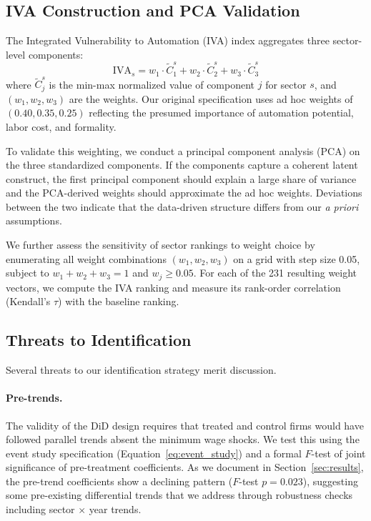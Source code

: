 \documentclass[5p,times,authoryear]{elsarticle}
\begin{document}
\subsection{IVA Construction and PCA Validation}
\label{subsec:iva}

The Integrated Vulnerability to Automation (IVA) index aggregates three sector-level components:
\begin{equation}
\label{eq:iva}
\text{IVA}_s = w_1 \cdot \tilde{C}_1^s + w_2 \cdot \tilde{C}_2^s + w_3 \cdot \tilde{C}_3^s
\end{equation}
where $\tilde{C}_j^s$ is the min-max normalized value of component $j$ for sector $s$, and $(w_1, w_2, w_3)$ are the weights. Our original specification uses ad hoc weights of $(0.40, 0.35, 0.25)$ reflecting the presumed importance of automation potential, labor cost, and formality.

To validate this weighting, we conduct a principal component analysis (PCA) on the three standardized components. If the components capture a coherent latent construct, the first principal component should explain a large share of variance and the PCA-derived weights should approximate the ad hoc weights. Deviations between the two indicate that the data-driven structure differs from our \textit{a priori} assumptions.

We further assess the sensitivity of sector rankings to weight choice by enumerating all weight combinations $(w_1, w_2, w_3)$ on a grid with step size 0.05, subject to $w_1 + w_2 + w_3 = 1$ and $w_j \geq 0.05$. For each of the 231 resulting weight vectors, we compute the IVA ranking and measure its rank-order correlation (Kendall's $\tau$) with the baseline ranking.

\subsection{Threats to Identification}
\label{subsec:threats}

Several threats to our identification strategy merit discussion.

\paragraph{Pre-trends.} The validity of the DiD design requires that treated and control firms would have followed parallel trends absent the minimum wage shocks. We test this using the event study specification (Equation~\ref{eq:event_study}) and a formal $F$-test of joint significance of pre-treatment coefficients. As we document in Section~\ref{sec:results}, the pre-trend coefficients show a declining pattern ($F$-test $p = 0.023$), suggesting some pre-existing differential trends that we address through robustness checks including sector $\times$ year trends.
\end{document}
